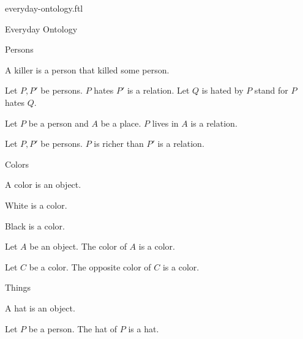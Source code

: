 \documentclass{naproche-library}
\begin{document}
\begin{smodule}{everyday-ontology.ftl}
\begin{sfragment}{Everyday Ontology}
\begin{sfragment}{Persons}
    \begin{definition*}[forthel]
      A killer is a person that killed some person.
    \end{definition*}

    \begin{signature*}[forthel]
      Let $P, P'$ be persons.
      $P$ hates $P'$ is a relation.
      Let $Q$ is hated by $P$ stand for $P$ hates $Q$.
    \end{signature*}

    \begin{signature*}[forthel]
      Let $P$ be a person and $A$ be a place.
      $P$ lives in $A$ is a relation.
    \end{signature*}

    \begin{signature*}[forthel]
      Let $P, P'$ be persons.
      $P$ is richer than $P'$ is a relation.
    \end{signature*}
  \end{sfragment}

  \begin{sfragment}{Colors}
    \begin{signature*}[forthel]
      A color is an object.
    \end{signature*}

    \begin{signature*}[forthel]
      White is a color.
    \end{signature*}

    \begin{signature*}[forthel]
      Black is a color.
    \end{signature*}

    \begin{signature*}[forthel]
      Let $A$ be an object.
      The color of $A$ is a color.
    \end{signature*}

    \begin{signature*}[forthel]
      Let $C$ be a color.
      The opposite color of $C$ is a color.
    \end{signature*}
  \end{sfragment}

  \begin{sfragment}{Things}
    \begin{signature*}[forthel]
      A hat is an object.
    \end{signature*}

    \begin{signature*}[forthel]
      Let $P$ be a person.
      The hat of $P$ is a hat.
    \end{signature*}
  \end{sfragment}


\end{sfragment}
\end{smodule}
\end{document}
